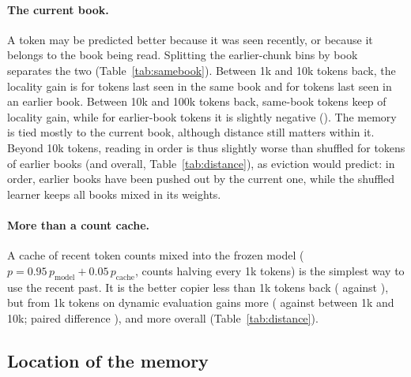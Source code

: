 \documentclass[10pt]{article}
\begin{document}
\paragraph{The current book.}
A token may be predicted better because it was seen recently, or because it belongs to the book being read.
Splitting the earlier-chunk bins by book separates the two (Table~\ref{tab:samebook}).
Between 1k and 10k tokens back, the locality gain is \localityTenKSamePM{} for tokens last seen in the same book and \localityTenKEarlierPM{} for tokens last seen in an earlier book.
Between 10k and 100k tokens back, same-book tokens keep \localityHundredKSamePM{} of locality gain, while for earlier-book tokens it is slightly negative (\localityHundredKEarlierPM{}).
The memory is tied mostly to the current book, although distance still matters within it.
Beyond 10k tokens, reading in order is thus slightly worse than shuffled for tokens of earlier books (and overall, Table~\ref{tab:distance}), as eviction would predict: in order, earlier books have been pushed out by the current one, while the shuffled learner keeps all books mixed in its weights.

\begin{table}[t]
\centering\footnotesize\setlength{\tabcolsep}{3.5pt}

\caption{Gain over frozen Pythia-14M by whether the token's previous occurrence is in the same book or an earlier one ($\pm$ SE over books); same runs as Table~\ref{tab:distance}. The earlier-book part of the $<$ 1k bin (\tokensOneKEarlierBook{} tokens) is omitted. $\dagger$: under 2 SE.}
\label{tab:samebook}
\end{table}

\paragraph{More than a count cache.}
A cache of recent token counts mixed into the frozen model ($p = 0.95\, p_\text{model} + 0.05\, p_\text{cache}$, counts halving every 1k tokens) is the simplest way to use the recent past.
It is the better copier less than 1k tokens back (\gainUnigramOneKPM{} against \gainInOrderOneK{}), but from 1k tokens on dynamic evaluation gains more (\gainInOrderTenK{} against \gainUnigramTenKPM{} between 1k and 10k; paired difference \inOrderMinusUnigramTenKPM{}), and \inOrderMinusUnigramAllPM{} more overall (Table~\ref{tab:distance}).

\subsection{Location of the memory}\label{sec:where}
\end{document}

